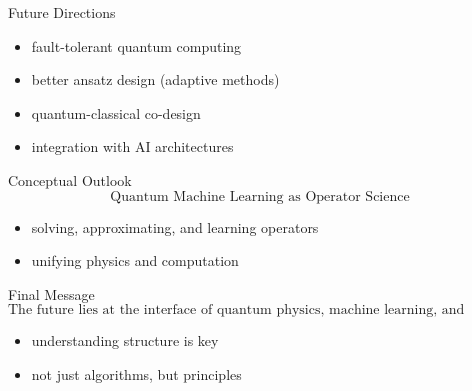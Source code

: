 \documentclass{beamer}
\begin{document}
\begin{frame}{Future Directions}
\begin{itemize}
\item fault-tolerant quantum computing
\item better ansatz design (adaptive methods)
\item quantum-classical co-design
\item integration with AI architectures
\end{itemize}
\end{frame}

\begin{frame}{Conceptual Outlook}
\[
\boxed{
\text{Quantum Machine Learning as Operator Science}
}
\]

\begin{itemize}
\item solving, approximating, and learning operators
\item unifying physics and computation
\end{itemize}
\end{frame}

\begin{frame}{Final Message}
\[
\boxed{
\text{The future lies at the interface of quantum physics, machine learning, and operator theory}
}
\]

\medskip

\begin{itemize}
\item understanding structure is key
\item not just algorithms, but principles
\end{itemize}
\end{frame}

%
%
%
%
%
%
\end{document}

